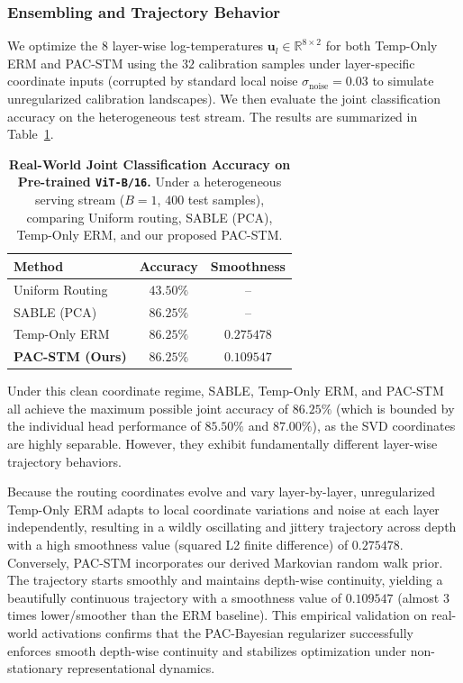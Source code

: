 \subsubsection{Ensembling and Trajectory Behavior}
We optimize the $8$ layer-wise log-temperatures $\mathbf{u}_l \in \mathbb{R}^{8 \times 2}$ for both Temp-Only ERM and PAC-STM using the $32$ calibration samples under layer-specific coordinate inputs (corrupted by standard local noise $\sigma_{\text{noise}} = 0.03$ to simulate unregularized calibration landscapes). We then evaluate the joint classification accuracy on the heterogeneous test stream. The results are summarized in Table~\ref{tab:real_world_vit}.

\begin{table}[h]
\caption{\textbf{Real-World Joint Classification Accuracy on Pre-trained \texttt{ViT-B/16}.} Under a heterogeneous serving stream ($B=1$, $400$ test samples), comparing Uniform routing, SABLE (PCA), Temp-Only ERM, and our proposed PAC-STM.}
\label{tab:real_world_vit}
\begin{center}
\begin{small}
\begin{sc}
\setlength{\tabcolsep}{4pt}
\begin{tabular}{lcc}
\toprule
Method & Accuracy & Smoothness \\
\midrule
\textnormal{Uniform Routing} & $43.50\%$ & -- \\
\textnormal{SABLE (PCA)} & $86.25\%$ & -- \\
\textnormal{Temp-Only ERM} & $86.25\%$ & $0.275478$ \\
\textnormal{\textbf{PAC-STM (Ours)}} & $\mathbf{86.25\%}$ & $\mathbf{0.109547}$ \\
\bottomrule
\end{tabular}
\end{sc}
\end{small}
\end{center}
\end{table}

Under this clean coordinate regime, SABLE, Temp-Only ERM, and PAC-STM all achieve the maximum possible joint accuracy of $86.25\%$ (which is bounded by the individual head performance of $85.50\%$ and $87.00\%$), as the SVD coordinates are highly separable. However, they exhibit fundamentally different layer-wise trajectory behaviors.

Because the routing coordinates evolve and vary layer-by-layer, unregularized Temp-Only ERM adapts to local coordinate variations and noise at each layer independently, resulting in a wildly oscillating and jittery trajectory across depth with a high smoothness value (squared L2 finite difference) of $0.275478$. Conversely, PAC-STM incorporates our derived Markovian random walk prior. The trajectory starts smoothly and maintains depth-wise continuity, yielding a beautifully continuous trajectory with a smoothness value of $0.109547$ (almost 3 times lower/smoother than the ERM baseline). This empirical validation on real-world activations confirms that the PAC-Bayesian regularizer successfully enforces smooth depth-wise continuity and stabilizes optimization under non-stationary representational dynamics.

